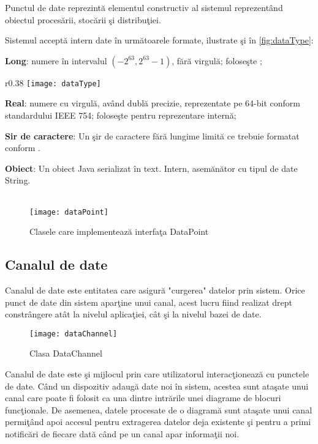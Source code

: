 Punctul de date reprezintă elementul constructiv al sistemul reprezentând obiectul procesării, stocării şi distribuţiei. 

Sistemul acceptă intern date în următoarele formate, ilustrate şi în \cref{fig:dataType}: 

\mitem \textbf{Long}: numere în intervalul $(-2^{63}, 2^{63} -1)$, fără virgulă; foloseşte ;
\begin{wrapfigure}{r}{0.38\textwidth}
	\centering
		\captionsetup{justification=centering}
	\texttt{[image: dataType]}
	\caption{Tipurile de date acceptate în sistem}
	\label{fig:dataType}
\end{wrapfigure}
\mitem \textbf{Real}: numere cu virgulă, având dublă precizie, reprezentate pe 64-bit conform standardului \autocite{4610935} IEEE 754;  foloseşte  pentru reprezentare internă;

\mitem \textbf{Sir de caractere}: Un şir de caractere fără lungime limită ce trebuie formatat conform \autocite{rfc4627}. 

\mitem \textbf{Obiect}: Un obiect Java serializat în text. Intern, asemănător cu tipul de date String. 
\mend
\\
\\
\begin{figure}[h]
	\centering
	\texttt{[image: dataPoint]}
	\caption{Clasele care implementează interfaţa DataPoint}
\end{figure}

\subsection{Canalul de date}

Canalul de date este entitatea care asigură "curgerea" datelor prin sistem. Orice punct de date din sistem aparţine unui canal, acest lucru fiind realizat drept constrângere atât la nivelul aplicaţiei, cât şi la nivelul bazei de date.
\begin{figure}[H]
	\centering
	\texttt{[image: dataChannel]}
	\caption{Clasa DataChannel}
\end{figure}

Canalul de date este şi mijlocul prin care utilizatorul interacţionează cu punctele de date. Când un dispozitiv adaugă date noi în sistem, acestea sunt ataşate unui canal  care poate fi folosit ca una dintre intrările unei diagrame de blocuri funcţionale. De asemenea, datele procesate de o diagramă sunt ataşate unui canal permiţând apoi accesul pentru extragerea datelor deja existente şi pentru a primi notificări de fiecare dată când pe un canal apar informaţii noi.

